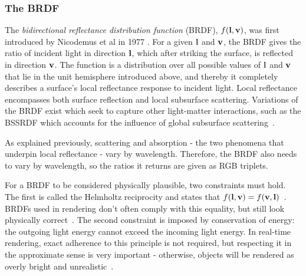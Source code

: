 \subsubsection{The BRDF}

The \textit{bidirectional reflectance distribution function} (BRDF), \begin{math}f(\mathbf{l}, \mathbf{v})\end{math}, was first introduced by Nicodemus et al in 1977 \cite{OriginalBRDF}. For a given \begin{math}\mathbf{l}\end{math} and \begin{math}\mathbf{v}\end{math}, the BRDF gives the ratio of incident light in direction \begin{math}\mathbf{l}\end{math}, which after striking the surface, is reflected in direction \begin{math}\mathbf{v}\end{math}. The function is a distribution over all possible values of \begin{math}\mathbf{l}\end{math} and \begin{math}\mathbf{v}\end{math} that lie in the unit hemisphere introduced above, and thereby it completely describes a surface's local reflectance response to incident light. Local reflectance encompasses both surface reflection and local subsurface scattering. Variations of the BRDF exist which seek to capture other light-matter interactions, such as the BSSRDF which accounts for the influence of global subsurface scattering~\cite{PracticalModelForSubsurfaceLightTransport}.

As explained previously, scattering and absorption - the two phenomena that underpin local reflectance - vary by wavelength. Therefore, the BRDF also needs to vary by wavelength, so the ratios it returns are given as RGB triplets.

For a BRDF to be considered physically plausible, two constraints must hold. The first is called the Helmholtz reciprocity and states that \begin{math}f(\mathbf{l}, \mathbf{v}) = f(\mathbf{v}, \mathbf{l})\end{math}~\cite{HelmholtzReciprocity}. BRDFs used in rendering don't often comply with this equality, but still look physically correct~\cite{RTR4}. The second constraint is imposed by conservation of energy: the outgoing light energy cannot exceed the incoming light energy. In real-time rendering, exact adherence to this principle is not required, but respecting it in the approximate sense is very important - otherwise, objects will be rendered as overly bright and unrealistic~\cite{RTR4}\cite{MovingFrostbitetoPBR}.

